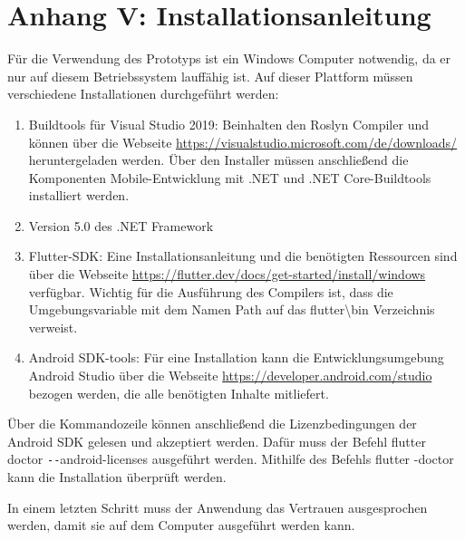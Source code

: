 \chapter{Anhang V: Installationsanleitung}
\label{chap:Installationsanleitung}

Für die Verwendung des Prototyps ist ein Windows Computer notwendig,  da er nur auf diesem Betriebssystem lauffähig ist.  
Auf dieser Plattform müssen verschiedene Installationen durchgeführt werden:

\begin{enumerate}
\setlength\itemsep{-0.6em}
	\item Buildtools für Visual Studio 2019: Beinhalten den Roslyn Compiler und können über die Webseite \url{https://visualstudio.microsoft.com/de/downloads/} heruntergeladen werden.  Über den Installer müssen anschließend die Komponenten \glqq Mobile-Entwicklung mit .NET\grqq{} und \glqq .NET 	Core-Buildtools\grqq{} installiert werden.	
	\item Version 5.0 des .NET Framework
	\item Flutter-SDK:  Eine Installationsanleitung und die benötigten Ressourcen sind über die Webseite \url{https://flutter.dev/docs/get-started/install/windows} verfügbar.  Wichtig für die Ausführung des Compilers ist,  dass die Umgebungsvariable mit dem Namen \glq Path\grq{}  auf das \glqq flutter\textbackslash bin\grqq{} Verzeichnis verweist. 
	\item Android SDK-tools: Für eine Installation kann die Entwicklungsumgebung Android Studio über die Webseite \url{https://developer.android.com/studio} bezogen werden,  die alle benötigten Inhalte mitliefert. 
 
\end{enumerate}


Über die Kommandozeile können anschließend die Lizenzbedingungen der Android SDK gelesen und akzeptiert werden.  Dafür muss der Befehl \glqq flutter doctor \texttt{-{}-}android-licenses\grqq{} ausgeführt werden.  Mithilfe des  Befehls \glqq flutter -doctor\grqq{} kann die Installation überprüft werden.

In einem letzten Schritt muss der Anwendung das Vertrauen ausgesprochen werden, damit sie auf dem Computer ausgeführt werden kann.
